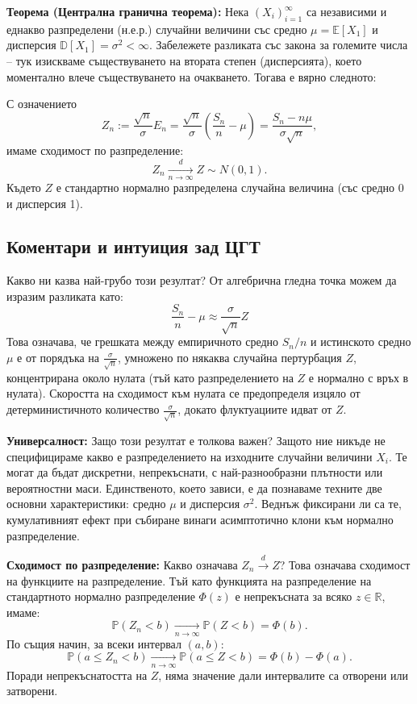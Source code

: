 \documentclass{article}
\begin{document}
\textbf{Теорема (Централна гранична теорема):} Нека $(X_i)_{i=1}^\infty$ са независими и еднакво разпределени (н.е.р.) случайни величини със средно $\mu = \mathbb{E}[X_1]$ и дисперсия $\mathbb{D}[X_1] = \sigma^2 < \infty$. Забележете разликата със закона за големите числа – тук изискваме съществуването на втората степен (дисперсията), което моментално влече съществуването на очакването. Тогава е вярно следното:

С означението 
\[ Z_n := \frac{\sqrt{n}}{\sigma} E_n = \frac{\sqrt{n}}{\sigma} \left( \frac{S_n}{n} - \mu \right) = \frac{S_n - n\mu}{\sigma\sqrt{n}}, \]
имаме сходимост по разпределение:
\[ Z_n \xrightarrow[n \to \infty]{d} Z \sim N(0,1). \]
Където $Z$ е стандартно нормално разпределена случайна величина (със средно 0 и дисперсия 1).

\subsection{Коментари и интуиция зад ЦГТ}

Какво ни казва най-грубо този резултат? От алгебрична гледна точка можем да изразим разликата като:
\[ \frac{S_n}{n} - \mu \approx \frac{\sigma}{\sqrt{n}} Z \]
Това означава, че грешката между емпиричното средно $S_n/n$ и истинското средно $\mu$ е от порядъка на $\frac{\sigma}{\sqrt{n}}$, умножено по някаква случайна пертурбация $Z$, концентрирана около нулата (тъй като разпределението на $Z$ е нормално с връх в нулата). Скоростта на сходимост към нулата се предопределя изцяло от детерминистичното количество $\frac{\sigma}{\sqrt{n}}$, докато флуктуациите идват от $Z$.

\textbf{Универсалност:} Защо този резултат е толкова важен? Защото ние никъде не специфицираме какво е разпределението на изходните случайни величини $X_i$. Те могат да бъдат дискретни, непрекъснати, с най-разнообразни плътности или вероятностни маси. Единственото, което зависи, е да познаваме техните две основни характеристики: средно $\mu$ и дисперсия $\sigma^2$. Веднъж фиксирани ли са те, кумулативният ефект при събиране винаги асимптотично клони към нормално разпределение. 

\textbf{Сходимост по разпределение:} Какво означава $Z_n \xrightarrow{d} Z$? Това означава сходимост на функциите на разпределение. Тъй като функцията на разпределение на стандартното нормално разпределение $\Phi(z)$ е непрекъсната за всяко $z \in \mathbb{R}$, имаме:
\[ \mathbb{P}(Z_n < b) \xrightarrow[n \to \infty]{} \mathbb{P}(Z < b) = \Phi(b). \]
По същия начин, за всеки интервал $(a, b)$:
\[ \mathbb{P}(a \le Z_n < b) \xrightarrow[n \to \infty]{} \mathbb{P}(a \le Z < b) = \Phi(b) - \Phi(a). \]
Поради непрекъснатостта на $Z$, няма значение дали интервалите са отворени или затворени. 
\end{document}
